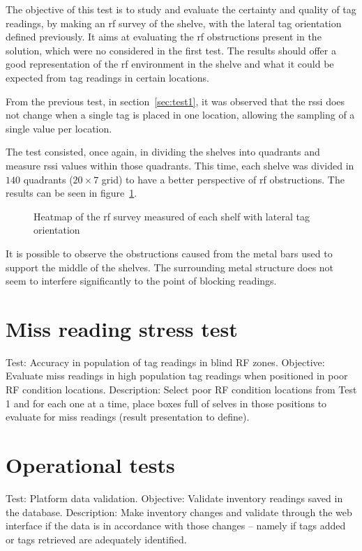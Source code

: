 The objective of this test is to study and evaluate the certainty and quality of tag readings, by making an \ac{rf} survey of the shelve, with the lateral tag orientation defined previously.
It aims at evaluating the \ac{rf} obstructions present in the solution, which were no considered in the first test.
The results should offer a good representation of the \ac{rf} environment in the shelve and what it could be expected from tag readings in certain locations. 

From the previous test, in section~\ref{sec:test1}, it was observed that the \ac{rssi} does not change when a single tag is placed in one location, allowing the sampling of a single value per location. 

The test consisted, once again, in dividing the shelves into quadrants and measure \ac{rssi} values within those quadrants. This time, each shelve was divided in $140$ quadrants ($20\times7$ grid) to have a better perspective of \ac{rf} obstructions.
The results can be seen in figure~\ref{fig:rfsurvey}.

\begin{figure}
    \centering
    \caption{Heatmap of the \ac{rf} survey measured of each shelf with lateral tag orientation}
    \label{fig:rfsurvey}
\end{figure}

It is possible to observe the obstructions caused from the metal bars used to support the middle of the shelves. The surrounding metal structure does not seem to interfere significantly to the point of blocking readings.

\section{Miss reading stress test}

Test: Accuracy in population of tag readings in blind RF zones.
Objective: Evaluate miss readings in high population tag readings when positioned in poor RF condition locations.
Description: Select poor RF condition locations from Test 1 and for each one at a time, place boxes full of selves in those positions to evaluate for miss readings (result presentation to define).


\section{Operational tests}

Test: Platform data validation.
Objective: Validate inventory readings saved in the database.
Description: Make inventory changes and validate through the web interface if the data is in accordance with those changes – namely if tags added or tags retrieved are adequately identified.